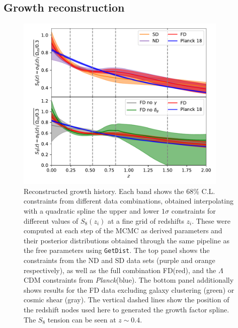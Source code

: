 \documentclass[a4paper,11pt]{article}
\newcommand{\lcdm}{$\Lambda$CDM\xspace}
\newcommand{\planck}{{\sl Planck}\xspace}
\newcommand{\northd}{ND\xspace}
\newcommand{\southd}{SD\xspace}
\newcommand{\alld}{FD\xspace}
\begin{document}
    \subsection{Growth reconstruction}\label{ssec:res.growth}
     \begin{figure}
        \centering
        \includegraphics[width=0.9\textwidth]{figures/FD_s8z.pdf}
        \caption{Reconstructed growth history. Each band shows the 68\% C.L. constraints from different data combinations, obtained interpolating with a quadratic spline the upper and lower $1 \sigma$ constraints for different values of $S_8(z_i)$ at a fine grid of redshifts $z_i$. These were computed at each step of the MCMC as derived parameters and their posterior distributions obtained through the same pipeline as the free parameters using \texttt{GetDist}. The top panel shows the constraints from the \northd and \southd data sets (purple and orange respectively), as well as the full combination \alld (red), and the \lcdm constraints from \planck (blue). The bottom panel additionally shows results for the \alld data excluding galaxy clustering (green) or cosmic shear (gray). The vertical dashed lines show the position of the redshift nodes used here to generated the growth factor spline. The $S_8$ tension can be seen at $z\sim 0.4$.}\label{fig:all_s8z}
      \end{figure}
      
\end{document}
